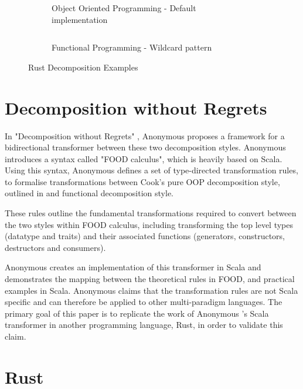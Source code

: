 \documentclass[ oneside,%
                    author={James Elgar},
                    degree={MEng},
                     title={Bidirectional transformer between functional and \\ object-oriented programming in Rust},
                  subtitle={}]{dissertation}
\newcommand{\weixin}{Anonymous }
\newcommand{\codefile}[2]{\inputminted[xleftmargin=20pt,linenos, breaklines]{#1}{#2}}
\newcommand{\rustfile}[1]{\codefile{rust}{../#1.rs}}
\newcommand{\rustexample}[1]{\rustfile{examples/src/#1}}
\begin{document}
\begin{figure}
\centering
\begin{subfigure}{.5\textwidth}
    \rustexample{shape2/oop}
    \caption{Object Oriented Programming - Default implementation}
    \label{fig:inheritance-example-oop}
\end{subfigure}%
\begin{subfigure}{.5\textwidth}
    \rustexample{shape2/fp}
    \caption{Functional Programming - Wildcard pattern}
    \label{fig:inheritance-example-fp}
\end{subfigure}
\caption{Rust Decomposition Examples}
\label{fig:inheritance-example}
\end{figure}

\section{Decomposition without Regrets}

In "Decomposition without Regrets" \cite{food}, \weixin proposes a framework for a bidirectional transformer between these two decomposition styles. \weixin introduces a syntax called "FOOD calculus", which is heavily based on Scala. Using this syntax, \weixin defines a set of type-directed transformation rules, to formalise transformations between Cook's pure OOP decomposition style, outlined in \cite{food} and functional decomposition style.

These rules outline the fundamental transformations required to convert between the two styles within FOOD calculus, including transforming the top level types (datatype and traits) and their associated functions (generators, constructors, destructors and consumers).


\weixin creates an implementation of this transformer in Scala and demonstrates the mapping between the theoretical rules in FOOD, and practical examples in Scala.
\weixin claims that the transformation rules are not Scala specific and can therefore be applied to other multi-paradigm languages. The primary goal of this paper is to replicate the work of \weixin's Scala transformer in another programming language, Rust, in order to validate this claim.



\section{Rust}
\end{document}
